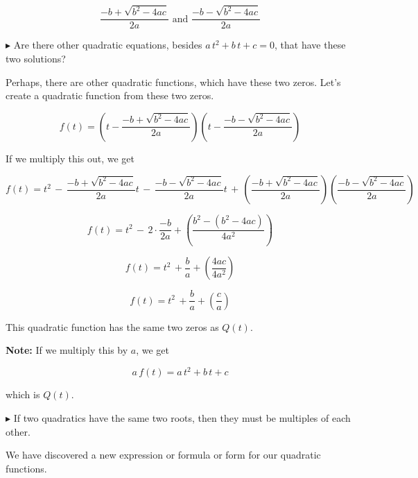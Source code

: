 \documentclass{ximera}
\begin{document}
\[   \frac{-b + \sqrt{b^2 - 4 a c}}{2a}     \text{ and }    \frac{-b - \sqrt{b^2 - 4 a c}}{2a}   \]





$\blacktriangleright$  Are there other quadratic equations, besides $a \, t^2 + b \, t + c = 0$, that have these two solutions?















Perhaps, there are other quadratic functions, which have these two zeros. Let's create a quadratic function from these two zeros.



\[ f(t) =  \left(t - \frac{-b + \sqrt{b^2 - 4 a c}}{2a}\right)   \left(t -  \frac{-b - \sqrt{b^2 - 4 a c}}{2a}\right)   \]


If we multiply this out, we get



\[ f(t) =   t^2 \, - \, \frac{-b + \sqrt{b^2 - 4 a c}}{2a} t \, - \, \frac{-b - \sqrt{b^2 - 4 a c}}{2a}  t \, + \, \left(\frac{-b + \sqrt{b^2 - 4 a c}}{2a}\right) \left(\frac{-b - \sqrt{b^2 - 4 a c}}{2a}\right) \]


\[ f(t) = t^2  \, - \, 2 \cdot \frac{-b}{2a} + \left(    \frac{b^2 - (b^2 - 4 a c)}{4 a^2}     \right)        \]


\[ f(t) = t^2  \, + \frac{b}{a} + \left(    \frac{4 a c}{4 a^2}     \right)        \]

\[ f(t) = t^2  \, +  \frac{b}{a} + \left(    \frac{c}{a}     \right)        \]


This quadratic function has the same two zeros as $Q(t)$.  


\textbf{Note:} If we multiply this by $a$, we get 


\[ a \, f(t) = a \, t^2 + b \, t + c \]

which is $Q(t)$.


$\blacktriangleright$ If two quadratics have the same two roots, then they must be multiples of each other.






We have discovered a new expression or formula or form for our quadratic functions.
\end{document}
